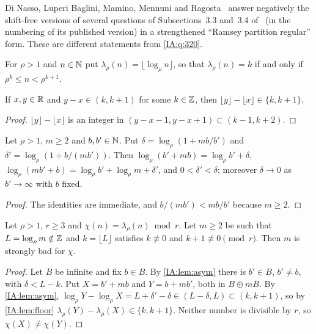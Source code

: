 \begin{remark}
Di Nasso, Luperi Baglini, Mamino, Mennuni and Ragosta~\cite[\S1]{dinasso2025ramsey} answer negatively
the shift-free versions of several questions of Subsections~3.3 and~3.4 of~\cite{kra2023problems}
(in the numbering of its published version) in a strengthened ``Ramsey partition regular'' form.
These are different statements from \cref{IA:q:320}.
\end{remark}

For $\rho>1$ and $n\in\mathbb{N}$ put $\lambda_\rho(n)=\lfloor\log_\rho n\rfloor$, so that $\lambda_\rho(n)=k$
if and only if $\rho^k\le n<\rho^{k+1}$.

\begin{lemma}\label{IA:lem:floor}
If $x,y\in\mathbb{R}$ and $y-x\in(k,k+1)$ for some $k\in\mathbb{Z}$, then $\lfloor y\rfloor-\lfloor x\rfloor\in\{k,k+1\}$.
\end{lemma}

\begin{proof}
$\lfloor y\rfloor-\lfloor x\rfloor$ is an integer in $(y-x-1,y-x+1)\subset(k-1,k+2)$.
\end{proof}

\begin{lemma}\label{IA:lem:asym}
Let $\rho>1$, $m\ge2$ and $b,b'\in\mathbb{N}$. Put $\delta=\log_\rho(1+mb/b')$ and
$\delta'=\log_\rho(1+b/(mb'))$. Then $\log_\rho(b'+mb)=\log_\rho b'+\delta$,
$\log_\rho(mb'+b)=\log_\rho b'+\log_\rho m+\delta'$, and $0<\delta'<\delta$; moreover $\delta\to0$
as $b'\to\infty$ with $b$ fixed.
\end{lemma}

\begin{proof}
The identities are immediate, and $b/(mb')<mb/b'$ because $m\ge2$.
\end{proof}

\begin{proposition}\label{IA:prop:320A}
Let $\rho>1$, $r\ge3$ and $\chi(n)=\lambda_\rho(n)\bmod r$. Let $m\ge2$ be such that
$L=\log_\rho m\notin\mathbb{Z}$ and $k=\lfloor L\rfloor$ satisfies $k\not\equiv0$ and $k+1\not\equiv0
\pmod r$. Then $m$ is strongly bad for $\chi$.
\end{proposition}

\begin{proof}
Let $B$ be infinite and fix $b\in B$. By \cref{IA:lem:asym} there is $b'\in B$, $b'\ne b$, with
$\delta<L-k$. Put $X=b'+mb$ and $Y=b+mb'$, both in $B\oplus mB$. By \cref{IA:lem:asym},
$\log_\rho Y-\log_\rho X=L+\delta'-\delta\in(L-\delta,L)\subset(k,k+1)$, so by \cref{IA:lem:floor}
$\lambda_\rho(Y)-\lambda_\rho(X)\in\{k,k+1\}$. Neither number is divisible by $r$, so
$\chi(X)\ne\chi(Y)$.
\end{proof}

